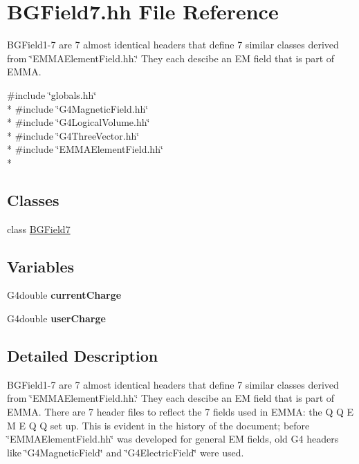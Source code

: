 \hypertarget{BGField7_8hh}{\section{B\-G\-Field7.\-hh File Reference}
\label{BGField7_8hh}
}


B\-G\-Field1-\/7 are 7 almost identical headers that define 7 similar classes derived from \char`\"{}\-E\-M\-M\-A\-Element\-Field.\-hh.\char`\"{} They each descibe an E\-M field that is part of E\-M\-M\-A.  


{\ttfamily \#include \char`\"{}globals.\-hh\char`\"{}}\\*
{\ttfamily \#include \char`\"{}G4\-Magnetic\-Field.\-hh\char`\"{}}\\*
{\ttfamily \#include \char`\"{}G4\-Logical\-Volume.\-hh\char`\"{}}\\*
{\ttfamily \#include \char`\"{}G4\-Three\-Vector.\-hh\char`\"{}}\\*
{\ttfamily \#include \char`\"{}E\-M\-M\-A\-Element\-Field.\-hh\char`\"{}}\\*
\subsection*{Classes}
\begin{DoxyCompactItemize}
\item 
class \hyperlink{classBGField7}{B\-G\-Field7}
\end{DoxyCompactItemize}
\subsection*{Variables}
\begin{DoxyCompactItemize}
\item 
\hypertarget{BGField7_8hh_acb265d8eecfa1acd31056f0c7915362e}{G4double {\bfseries current\-Charge}}\label{BGField7_8hh_acb265d8eecfa1acd31056f0c7915362e}

\item 
\hypertarget{BGField7_8hh_a2d61cdd1b1b5ed409f7c91b54737c1b9}{G4double {\bfseries user\-Charge}}\label{BGField7_8hh_a2d61cdd1b1b5ed409f7c91b54737c1b9}

\end{DoxyCompactItemize}


\subsection{Detailed Description}
B\-G\-Field1-\/7 are 7 almost identical headers that define 7 similar classes derived from \char`\"{}\-E\-M\-M\-A\-Element\-Field.\-hh.\char`\"{} They each descibe an E\-M field that is part of E\-M\-M\-A. There are 7 header files to reflect the 7 fields used in E\-M\-M\-A\-: the Q Q E M E Q Q set up. This is evident in the history of the document; before \char`\"{}\-E\-M\-M\-A\-Element\-Field.\-hh\char`\"{} was developed for general E\-M fields, old G4 headers like \char`\"{}\-G4\-Magnetic\-Field\char`\"{} and \char`\"{}\-G4\-Electric\-Field\char`\"{} were used. 